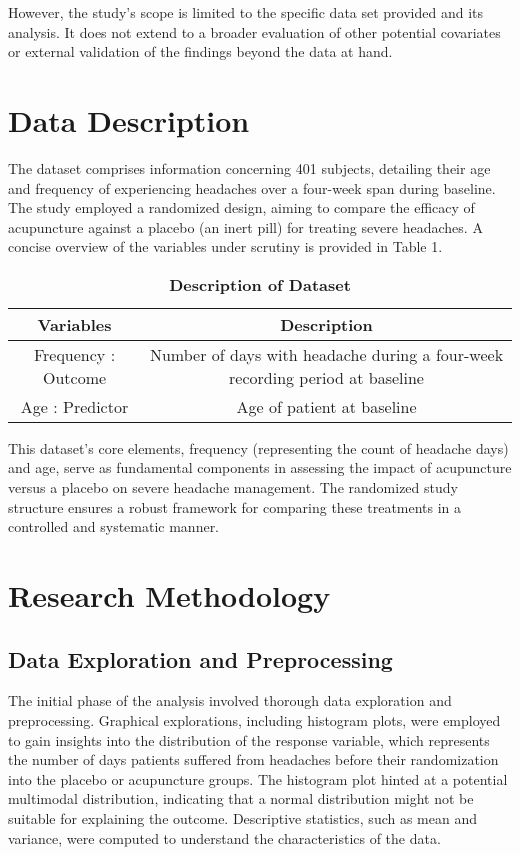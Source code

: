 \documentclass[a4paper, 12pt]{article}
\begin{document}
However, the study's scope is limited to the specific data set provided and its analysis. It does not extend to a broader evaluation of other potential covariates or external validation of the findings beyond the data at hand.


\section{Data Description}
The dataset comprises information concerning 401 subjects, detailing their age and frequency of experiencing headaches over a four-week span during baseline. The study employed a randomized design, aiming to compare the efficacy of acupuncture against a placebo (an inert pill) for treating severe headaches. A concise overview of the variables under scrutiny is provided in Table 1.


\begin{center}
\begin{table}[H]
\begin{tabular}{ |c|c|} 
 \hline
\textbf{Variables} & \textbf{Description} \\
\hline
Frequency : Outcome  & Number of days with headache during a four-week recording period at baseline  \\ 
\hline
 Age : Predictor & Age of patient at baseline \\ 
 \hline 
\end{tabular}
\caption{ \textbf{Description of Dataset}}
\end{table}
\end{center}

This dataset's core elements, frequency (representing the count of headache days) and age, serve as fundamental components in assessing the impact of acupuncture versus a placebo on severe headache management. The randomized study structure ensures a robust framework for comparing these treatments in a controlled and systematic manner.


\section{ Research Methodology}


 \subsection{Data Exploration and Preprocessing}
The initial phase of the analysis involved thorough data exploration and preprocessing. Graphical explorations, including histogram plots, were employed to gain insights into the distribution of the response variable, which represents the number of days patients suffered from headaches before their randomization into the placebo or acupuncture groups. The histogram plot hinted at a potential multimodal distribution, indicating that a normal distribution might not be suitable for explaining the outcome. Descriptive statistics, such as mean and variance, were computed to understand the characteristics of the data.
\end{document}
